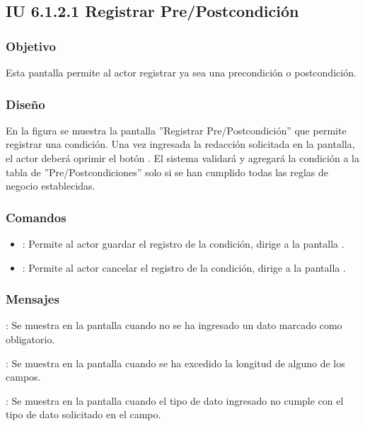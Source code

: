 \subsection{IU 6.1.2.1 Registrar Pre/Postcondición}

\subsubsection{Objetivo}
	Esta pantalla permite al actor registrar ya sea una precondición o postcondición.
\subsubsection{Diseño}
	En la figura  se muestra la pantalla ''Registrar Pre/Postcondición'' que permite registrar una condición. Una vez ingresada la redacción solicitada en la pantalla, el actor deberá oprimir el botón  . El sistema validará y agregará la condición a la tabla de ''Pre/Postcondiciones'' solo si se han cumplido todas las reglas de negocio establecidas.

\subsubsection{Comandos}
\begin{itemize}
	\item {}: Permite al actor guardar el registro de la condición, dirige a la pantalla .
	\item {}: Permite al actor cancelar el registro de la condición, dirige a la pantalla .
\end{itemize}

\subsubsection{Mensajes}

\begin{Citemize}
	\item {}: Se muestra en la pantalla  cuando no se ha ingresado un dato marcado como obligatorio.
	\item {}: Se muestra en la pantalla  cuando se ha excedido la longitud de alguno de los campos.
	\item {}: Se muestra en la pantalla  cuando el tipo de dato ingresado no cumple con el tipo de dato solicitado en el campo.
\end{Citemize}
